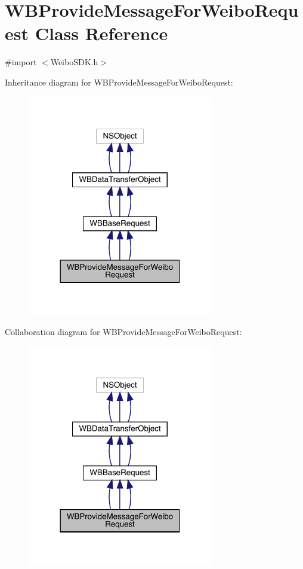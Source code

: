 \hypertarget{interface_w_b_provide_message_for_weibo_request}{}\section{W\+B\+Provide\+Message\+For\+Weibo\+Request Class Reference}
\label{interface_w_b_provide_message_for_weibo_request}


{\ttfamily \#import $<$Weibo\+S\+D\+K.\+h$>$}



Inheritance diagram for W\+B\+Provide\+Message\+For\+Weibo\+Request\+:\nopagebreak
\begin{figure}[H]
\begin{center}
\leavevmode
\includegraphics[width=230pt]{interface_w_b_provide_message_for_weibo_request__inherit__graph}
\end{center}
\end{figure}


Collaboration diagram for W\+B\+Provide\+Message\+For\+Weibo\+Request\+:\nopagebreak
\begin{figure}[H]
\begin{center}
\leavevmode
\includegraphics[width=230pt]{interface_w_b_provide_message_for_weibo_request__coll__graph}
\end{center}
\end{figure}
